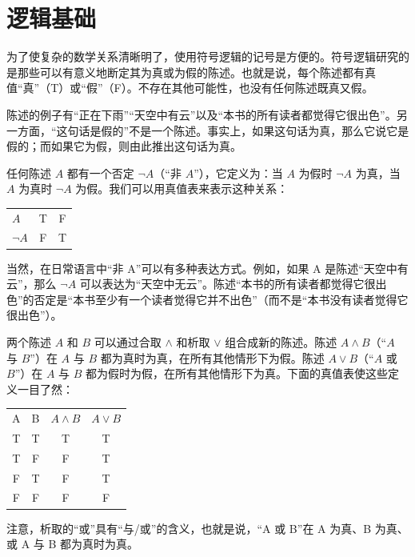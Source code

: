 \section{逻辑基础}

为了使复杂的数学关系清晰明了，使用符号逻辑的记号是方便的。符号逻辑研究的是那些可以有意义地断定其为真或为假的陈述。也就是说，每个陈述都有真值“真”（T）或“假”（F）。不存在其他可能性，也没有任何陈述既真又假。

陈述的例子有“正在下雨”“天空中有云”以及“本书的所有读者都觉得它很出色”。另一方面，“这句话是假的”不是一个陈述。事实上，如果这句话为真，那么它说它是假的；而如果它为假，则由此推出这句话为真。

任何陈述 $ A $ 都有一个否定 $ \neg A $（“非 $ A $”），它定义为：当 $ A $ 为假时 $ \neg A $ 为真，当 $ A $ 为真时 $ \neg A $ 为假。我们可以用真值表来表示这种关系：

\begin{center}
\begin{tabular}{lcc}
\toprule
$ A $ & T & F \\
$ \neg A $ & F & T \\
\bottomrule
\end{tabular}
\end{center}

当然，在日常语言中“非 A”可以有多种表达方式。例如，如果 A 是陈述“天空中有云”，那么 $ \neg A $ 可以表达为“天空中无云”。陈述“本书的所有读者都觉得它很出色”的否定是“本书至少有一个读者觉得它并不出色”（而不是“本书没有读者觉得它很出色”）。

两个陈述 $A$ 和 $B$ 可以通过合取 $\land$ 和析取 $\lor$ 组合成新的陈述。陈述 $A \land B$（“$A$ 与 $B$”）在 $A$ 与 $B$ 都为真时为真，在所有其他情形下为假。陈述 $A \lor B$（“$A$ 或 $B$”）在 $A$ 与 $B$ 都为假时为假，在所有其他情形下为真。下面的真值表使这些定义一目了然：

\begin{center}
\begin{tabular}{cccc}
\toprule
A & B & $ A \land B $ & $ A \lor B $ \\
T & T & T & T \\
T & F & F & T \\
F & T & F & T \\
F & F & F & F \\
\bottomrule
\end{tabular}
\end{center}

注意，析取的“或”具有“与/或”的含义，也就是说，“A 或 B”在 A 为真、B 为真、或 A 与 B 都为真时为真。

